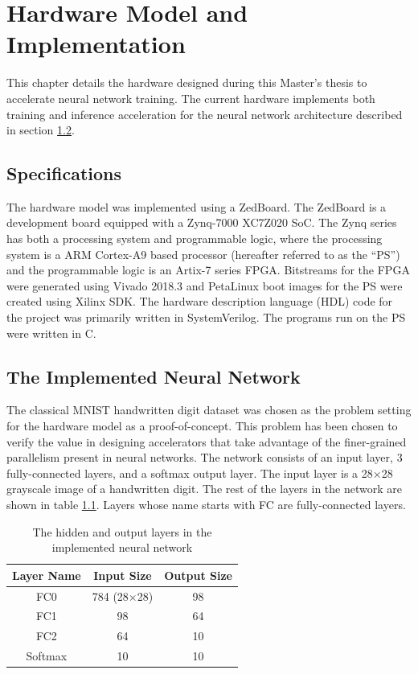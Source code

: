 \chapter{Hardware Model and Implementation}

This chapter details the hardware designed during this Master's thesis to accelerate neural network training. The current hardware implements both training and inference acceleration for the neural network architecture described in section \ref{net-arch}.
\section{Specifications}
The hardware model was implemented using a ZedBoard. The ZedBoard is a development board equipped with a Zynq-7000 XC7Z020 SoC. The Zynq series has both a processing system and programmable logic, where the processing system is a ARM Cortex-A9 based processor (hereafter referred to as the ``PS'') and the programmable logic is an Artix-7 series FPGA. Bitstreams for the FPGA were generated using Vivado 2018.3 and PetaLinux boot images for the PS were created using Xilinx SDK. The hardware description language (HDL) code for the project was primarily written in SystemVerilog. The programs run on the PS were written in C.

\section{The Implemented Neural Network}\label{net-arch}
The classical MNIST handwritten digit dataset was chosen as the problem setting for the hardware model as a proof-of-concept. This problem has been chosen to verify the value in designing accelerators that take advantage of the finer-grained parallelism present in neural networks. The network consists of an input layer, 3 fully-connected layers, and a softmax output layer. The input layer is a 28$\times$28 grayscale image of a handwritten digit. The rest of the layers in the network are shown in table \ref{net-arch-table}. Layers whose name starts with FC are fully-connected layers. 
\begin{table}
	\centering
	\begin{tabular}{|c| c| c|}
		\hline
		\textbf{Layer Name}	& \textbf{Input Size} & \textbf{Output Size}\\\hline
		FC0	& 784 (28$\times$28) & 98 \\\hline
		FC1 & 98 & 64 \\\hline
		FC2 & 64 & 10 \\\hline
		Softmax & 10 & 10\\\hline
	\end{tabular}
	\caption{The hidden and output layers in the implemented neural network}
	\label{net-arch-table}
\end{table}

